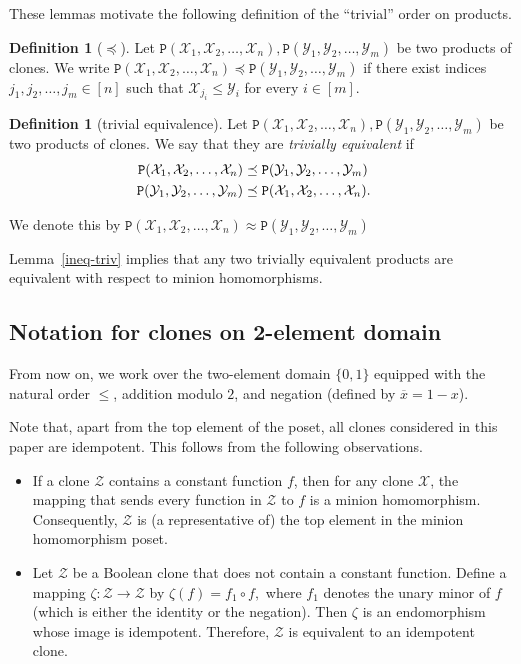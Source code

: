 \documentclass{amsart}
\numberwithin{equation}{section}
\theoremstyle{plain}
\theoremstyle{definition}
\newtheorem{definition}[theorem]{Definition}
\def\clone#1{\mathcal{#1}}
\def\C#1{{\mathtt{P}}(#1)}
\begin{document}
These lemmas motivate the following definition of the ``trivial'' order on products.

\begin{definition}[$\preceq$]
Let $\C{\clone{X}_1,\clone{X}_2,\dots,\clone{X}_n}, \C{\clone{Y}_1,\clone{Y}_2,\dots,\clone{Y}_m}$ be two products of clones. We write $\C{\clone{X}_1,\clone{X}_2,\dots,\clone{X}_n}\preceq \C{\clone{Y}_1,\clone{Y}_2,\dots,\clone{Y}_m}$ if there exist indices $j_1,j_2,\dots,j_m \in [n]$ such that $\clone{X}_{j_i}\leq \clone{Y}_i$ for every $i\in[m]$.
\end{definition}

\begin{definition}[trivial equivalence]
Let $\C{\clone{X}_1,\clone{X}_2,\dots,\clone{X}_n}, \C{\clone{Y}_1,\clone{Y}_2,\dots,\clone{Y}_m}$ be two products of clones. We say that they are {\em trivially equivalent} if
\begin{align}
\C{\clone{X}_1,\clone{X}_2,\dots,\clone{X}_n}&\preceq \C{\clone{Y}_1,\clone{Y}_2,\dots,\clone{Y}_m}\cr
\C{\clone{Y}_1,\clone{Y}_2,\dots,\clone{Y}_m}&\preceq \C{\clone{X}_1,\clone{X}_2,\dots,\clone{X}_n}.
\end{align}

We denote this by $\C{\clone{X}_1,\clone{X}_2,\dots,\clone{X}_n}\approx \C{\clone{Y}_1,\clone{Y}_2,\dots,\clone{Y}_m}$
\end{definition}

Lemma~\ref{ineq-triv} implies that any two trivially equivalent products are equivalent with respect to minion homomorphisms.



\subsection{Notation for clones on 2-element domain}

From now on, we work over the two-element domain $\{0,1\}$ equipped with the natural order $\leq$, addition modulo $2$, and negation (defined by $\overline{x}=1-x$). 

Note that, apart from the top element of the poset, all clones considered in this paper are idempotent. This follows from the following observations.
\begin{itemize}
  \item If a clone $\clone{Z}$ contains a constant function $f$, then for any clone $\clone{X}$, the mapping that sends every function in $\clone{Z}$ to $f$ is a minion homomorphism. Consequently, $\clone{Z}$ is (a representative of) the top element in the minion homomorphism poset.
  \item Let $\clone{Z}$ be a Boolean clone that does not contain a constant function. Define a mapping $\zeta:\clone{Z}\to\clone{Z}$  by $\zeta(f) = f_1\circ f,$ where $f_1$ denotes the unary minor of $f$ (which is either the identity or the negation). Then $\zeta$ is an endomorphism whose image is idempotent. Therefore, $\clone{Z}$ is equivalent to an idempotent clone.  
\end{itemize}
\end{document}
